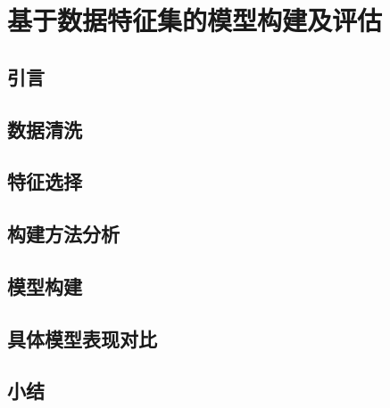 \chapter{基于数据特征集的模型构建及评估}
\section{引言}

\section{数据清洗}
\section{特征选择}
\section{构建方法分析}
\section{模型构建}
\section{具体模型表现对比}
\section{小结}